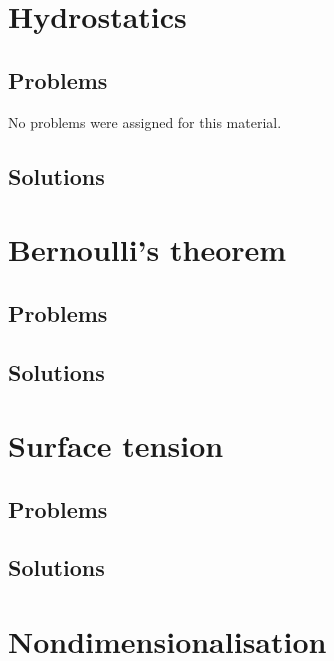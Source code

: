 \chapter{Hydrostatics}
   
   \section{Problems}
      No problems were assigned for this material.
   \section{Solutions}
      \shipoutAnswer

\chapter{Bernoulli's theorem}
   
   
   \section{Problems}
      
      
   \section{Solutions}
      \shipoutAnswer

\chapter{Surface tension}
   
   \section{Problems}
      
   \section{Solutions}
      \shipoutAnswer

\chapter{Nondimensionalisation}
   
   
   
